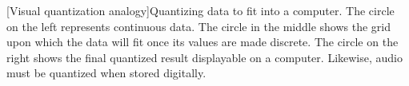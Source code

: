 [Visual quantization analogy]Quantizing data to fit into a computer. The circle on the left represents continuous data. The circle in the middle shows the grid upon which the data will fit once its values are made discrete. The circle on the right shows the final quantized result displayable on a computer. Likewise, audio must be quantized when stored digitally.